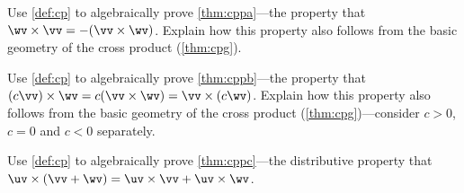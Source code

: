 \begin{exercise} \label{ex:cppa} 
Use \cref{def:cp} to algebraically prove \cref{thm:cppa}---the property that \(\wv\times\vv=-(\vv\times\wv)\).
Explain how this property also follows from the basic geometry of the cross product (\cref{thm:cpg}).
\end{exercise}



\begin{exercise} \label{ex:cppb} 
Use \cref{def:cp} to algebraically prove \cref{thm:cppb}---the property that \((c\vv)\times\wv=c(\vv\times\wv)=\vv\times(c\wv)\).
Explain how this property also follows from the basic geometry of the cross product (\cref{thm:cpg})---consider \(c>0\), \(c=0\) and \(c<0\) separately.
\end{exercise}



\begin{exercise} \label{ex:cppc} 
Use \cref{def:cp} to algebraically prove \cref{thm:cppc}---the distributive property that \(\uv\times(\vv+\wv)=\uv\times\vv+\uv\times\wv\).
\end{exercise}





